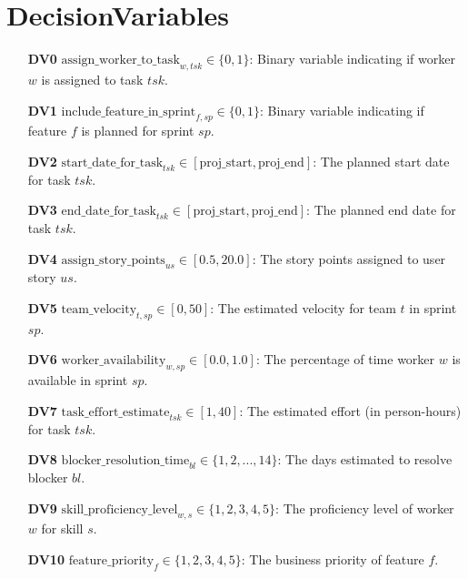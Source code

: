 \documentclass[11pt]{article}
\begin{document}
\section{DecisionVariables}
\begin{itemize}
    \item[\textbf{DV0}] $\text{assign\_worker\_to\_task}_{w, tsk} \in \{0, 1\}$: Binary variable indicating if worker $w$ is assigned to task $tsk$.
    \item[\textbf{DV1}] $\text{include\_feature\_in\_sprint}_{f, sp} \in \{0, 1\}$: Binary variable indicating if feature $f$ is planned for sprint $sp$.
    \item[\textbf{DV2}] $\text{start\_date\_for\_task}_{tsk} \in [\text{proj\_start}, \text{proj\_end}]$: The planned start date for task $tsk$.
    \item[\textbf{DV3}] $\text{end\_date\_for\_task}_{tsk} \in [\text{proj\_start}, \text{proj\_end}]$: The planned end date for task $tsk$.
    \item[\textbf{DV4}] $\text{assign\_story\_points}_{us} \in [0.5, 20.0]$: The story points assigned to user story $us$.
    \item[\textbf{DV5}] $\text{team\_velocity}_{t, sp} \in [0, 50]$: The estimated velocity for team $t$ in sprint $sp$.
    \item[\textbf{DV6}] $\text{worker\_availability}_{w, sp} \in [0.0, 1.0]$: The percentage of time worker $w$ is available in sprint $sp$.
    \item[\textbf{DV7}] $\text{task\_effort\_estimate}_{tsk} \in [1, 40]$: The estimated effort (in person-hours) for task $tsk$.
    \item[\textbf{DV8}] $\text{blocker\_resolution\_time}_{bl} \in \{1, 2, ..., 14\}$: The days estimated to resolve blocker $bl$.
    \item[\textbf{DV9}] $\text{skill\_proficiency\_level}_{w, s} \in \{1, 2, 3, 4, 5\}$: The proficiency level of worker $w$ for skill $s$.
    \item[\textbf{DV10}] $\text{feature\_priority}_{f} \in \{1, 2, 3, 4, 5\}$: The business priority of feature $f$.
\end{itemize}
\end{document}
